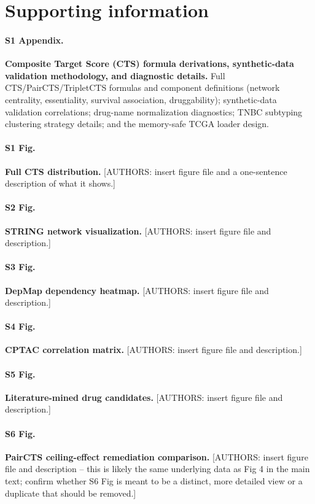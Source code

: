 \documentclass[10pt,letterpaper]{article}
\begin{document}
\section*{Supporting information}

\paragraph*{S1 Appendix.}
\label{S1_Appendix}
\textbf{Composite Target Score (CTS) formula derivations, synthetic-data validation
methodology, and diagnostic details.} Full CTS/PairCTS/TripletCTS formulas and
component definitions (network centrality, essentiality, survival association,
druggability); synthetic-data validation correlations; drug-name normalization
diagnostics; TNBC subtyping clustering strategy details; and the memory-safe TCGA
loader design.

\paragraph*{S1 Fig.}
\label{S1_Fig}
\textbf{Full CTS distribution.} [AUTHORS: insert figure file and a one-sentence
description of what it shows.]

\paragraph*{S2 Fig.}
\label{S2_Fig}
\textbf{STRING network visualization.} [AUTHORS: insert figure file and description.]

\paragraph*{S3 Fig.}
\label{S3_Fig}
\textbf{DepMap dependency heatmap.} [AUTHORS: insert figure file and description.]

\paragraph*{S4 Fig.}
\label{S4_Fig}
\textbf{CPTAC correlation matrix.} [AUTHORS: insert figure file and description.]

\paragraph*{S5 Fig.}
\label{S5_Fig}
\textbf{Literature-mined drug candidates.} [AUTHORS: insert figure file and description.]

\paragraph*{S6 Fig.}
\label{S6_Fig}
\textbf{PairCTS ceiling-effect remediation comparison.} [AUTHORS: insert figure file and
description -- this is likely the same underlying data as Fig 4 in the main text; confirm
whether S6 Fig is meant to be a distinct, more detailed view or a duplicate that should be
removed.]

\nolinenumbers


\end{document}
